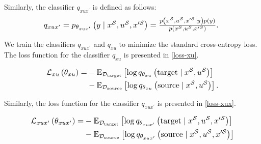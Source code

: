 Similarly, the classifier $q_{xu{x}^{\prime}}$ is defined as follows:
\begin{equation}
\label{qxux}
\resizebox{0.72\hsize}{!}{%
\begin{math}
q_{xu{x}^{\prime}}=p_{\theta_{x u x^{\prime}}}\left(y \mid x^{\mathcal{S}}, u^{\mathcal{S}}, x^{\prime \mathcal{S}}\right)=\frac{p\left(x^{\mathcal{S}}, u^{\mathcal{S}}, x^{\prime \mathcal{S}} \mid y\right) p(y)}{p\left(x^{\mathcal{S}}, u^{\mathcal{S}}, x^{\prime \mathcal{S}}\right)}.
\end{math}
}
\end{equation}

\newpage
We train the classifiers $q_{xu{x}^{\prime}}$ and $q_{xu}$ to minimize the standard cross-entropy loss. The loss function for the classifier $q_{xu}$ is presented in \autoref{loss-xu}.




\begin{equation}
\label{loss-xu}
\resizebox{0.72\hsize}{!}{
\begin{math}
\begin{aligned}
\mathcal{L}_{xu}\left(\theta_{xu}\right) = & -\mathbb{E}_{\mathcal{D}_{\text{target}}}\left[\log q_{\theta_{xu}}\left(\text{target} \mid x^{\mathcal{S}}, u^{\mathcal{S}}\right)\right] \\
& -\mathbb{E}_{\mathcal{D}_{\text{source}}}\left[\log q_{\theta_{xu}}\left(\text {source} \mid x^{\mathcal{S}}, u^{\mathcal{S}}\right)\right] .
\end{aligned}
\end{math}
}
\end{equation}


Similarly, the loss function for the classifier $q_{xu{x}^{\prime}}$ is presented in \autoref{loss-xux}.


\begin{equation}
\label{loss-xux}
\resizebox{0.85\hsize}{!}{
\begin{math}
\begin{aligned}
\mathcal{L}_{xu{x}^{\prime}}\left(\theta_{xu{x}^{\prime}}\right) = & -\mathbb{E}_{\mathcal{D}_{\text {target}}}\left[\log q_{\theta_{xu{x}^{\prime}}}\left(\text{target} \mid x^{\mathcal{S}}, u^{\mathcal{S}}, x^{\prime \mathcal{S}}\right)\right] \\
& -\mathbb{E}_{\mathcal{D}_{\text{source}}}\left[\log q_{\theta_{xu{x}^{\prime}}}\left(\text {source} \mid x^{\mathcal{S}}, u^{\mathcal{S}}, x^{\prime \mathcal{S}}\right)\right]
\end{aligned}
\end{math}
}
\end{equation}



